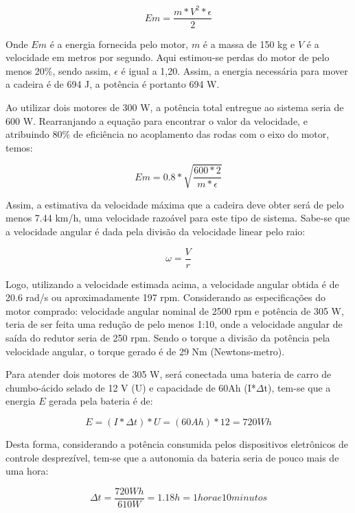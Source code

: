 \begin{equation}
Em = \frac{m*V^2*\epsilon}{2}
\end{equation}

Onde $Em$ é a energia fornecida pelo motor, $m$ é a massa de 150 kg e $V$ é a velocidade em metros por segundo. Aqui estimou-se perdas do motor de pelo menos 20\%, sendo assim, $\epsilon$ é igual a 1,20. Assim, a energia necessária para mover a cadeira é de 694 J, a potência é portanto 694 W.

Ao utilizar dois motores de 300 W, a potência total entregue ao sistema seria de 600 W. Rearranjando a equação para encontrar o valor da velocidade, e atribuindo 80\% de eficiência no acoplamento das rodas com o eixo do motor, temos:

\begin{equation}
Em = 0.8*\sqrt{\frac{600*2}{m*\epsilon}}
\end{equation}

Assim, a estimativa da velocidade máxima que a cadeira deve obter será de pelo menos 7.44 km/h, uma velocidade razoável para este tipo de sistema. Sabe-se que a velocidade angular é dada pela divisão da velocidade linear pelo raio:

\begin{equation}
\omega = \frac{V}{r}
\end{equation}

Logo, utilizando a velocidade estimada acima, a velocidade angular obtida é de 20.6 rad/s ou aproximadamente 197 rpm. Considerando as especificações do motor comprado: velocidade angular nominal de 2500 rpm e potência de 305 W, teria de ser feita uma redução de pelo menos 1:10, onde a velocidade angular de saída do redutor seria de 250 rpm. Sendo o torque a divisão da potência pela velocidade angular, o torque gerado é de 29 Nm (Newtons-metro).

Para atender dois motores de 305 W, será conectada uma bateria de carro de chumbo-ácido selado de 12 V (U) e capacidade de 60Ah (I*$\Delta$t), tem-se que a energia $E$ gerada pela bateria é de:

\begin{equation}
E = (I*\Delta t)*U = (60Ah)*12 = 720Wh
\end{equation}

Desta forma, considerando a potência consumida pelos dispositivos eletrônicos de controle desprezível, tem-se que a autonomia da bateria seria de pouco mais de uma hora:

\begin{equation}
\Delta t = \frac{720 Wh}{610 W} = 1.18 h = 1 hora e 10 minutos
\end{equation}

